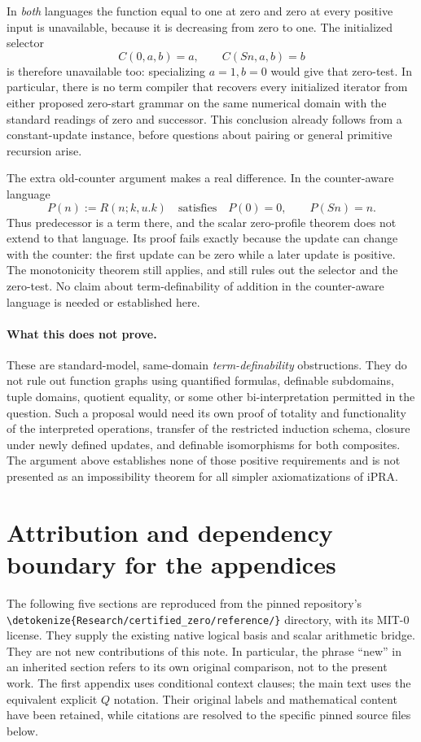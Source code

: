 \documentclass[11pt,letterpaper]{article}
\theoremstyle{definition}
\theoremstyle{remark}
\newcommand{\file}[1]{\expandafter\nolinkurl\expandafter{\detokenize{#1}}}
\begin{document}
In \emph{both} languages the function equal to one at zero and zero at
every positive input is unavailable, because it is decreasing from zero
to one. The initialized selector
\[
 C(0,a,b)=a,\qquad C(Sn,a,b)=b
\]
is therefore unavailable too: specializing $a=1,b=0$ would give that
zero-test. In particular, there is no term compiler that recovers every
initialized iterator from either proposed zero-start grammar on the
same numerical domain with the standard readings of zero and successor.
This conclusion already follows from a constant-update instance, before
questions about pairing or general primitive recursion arise.

The extra old-counter argument makes a real difference. In the
counter-aware language
\[
 P(n):=R(n;k,u.k)
 \quad\text{satisfies}\quad P(0)=0,\qquad P(Sn)=n.
\]
Thus predecessor is a term there, and the scalar zero-profile theorem
does not extend to that language. Its proof fails exactly because the
update can change with the counter: the first update can be zero while
a later update is positive. The monotonicity theorem still applies, and
still rules out the selector and the zero-test. No claim about
term-definability of addition in the counter-aware language is needed
or established here.

\paragraph{What this does not prove.}
These are standard-model, same-domain \emph{term-definability}
obstructions. They do not rule out function graphs using quantified
formulas, definable subdomains, tuple domains, quotient equality, or
some other bi-interpretation permitted in the question. Such a proposal
would need its own proof of totality and functionality of the interpreted
operations, transfer of the restricted induction schema, closure under
newly defined updates, and definable isomorphisms for both composites.
The argument above establishes none of those positive requirements and
is not presented as an impossibility theorem for all simpler
axiomatizations of iPRA.



\clearpage
\appendix
\section*{Attribution and dependency boundary for the appendices}
The following five sections are reproduced from the pinned repository's
\file{Research/certified_zero/reference/} directory, with its MIT-0 license.
They supply the existing native logical basis and scalar arithmetic bridge.
They are not new contributions of this note. In particular, the phrase
``new'' in an inherited section refers to its own original comparison,
not to the present work. The first appendix uses conditional context
clauses; the main text uses the equivalent explicit $Q$ notation.
Their original labels and mathematical content have been retained, while
citations are resolved to the specific pinned source files below.
\end{document}

